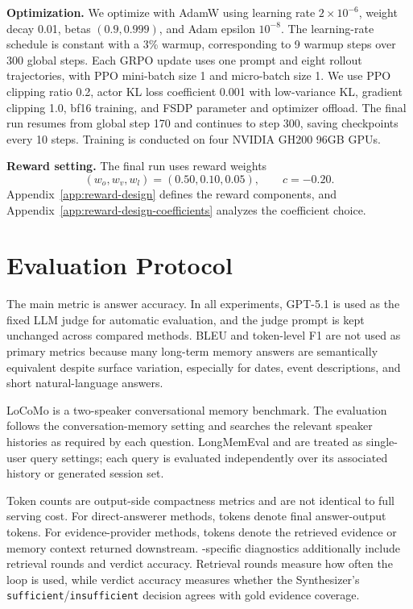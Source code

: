 \textbf{Optimization.}
We optimize with AdamW using learning rate \(2{\times}10^{-6}\), weight decay
0.01, betas \((0.9,0.999)\), and Adam epsilon \(10^{-8}\). The learning-rate
schedule is constant with a 3\% warmup, corresponding to 9 warmup steps over
300 global steps. Each GRPO update uses one prompt and eight rollout
trajectories, with PPO mini-batch size 1 and micro-batch size 1. We use PPO
clipping ratio 0.2, actor KL loss coefficient 0.001 with low-variance KL,
gradient clipping 1.0, bf16 training, and FSDP parameter and optimizer
offload. The final run resumes from global step 170 and continues to step 300,
saving checkpoints every 10 steps. Training is conducted on four NVIDIA GH200
96GB GPUs.

\textbf{Reward setting.}
The final run uses reward weights
\[
  (w_o,w_v,w_l)=(0.50,0.10,0.05),
  \qquad c=-0.20.
\]
Appendix~\ref{app:reward-design} defines the reward components, and
Appendix~\ref{app:reward-design-coefficients} analyzes the coefficient choice.

\section{Evaluation Protocol}
\label{app:evaluation-protocol}

The main metric is answer accuracy. In all experiments, GPT-5.1 is used as the
fixed LLM judge for automatic evaluation, and the judge prompt is kept
unchanged across compared methods. BLEU and token-level F1 are not used as
primary metrics because many long-term memory answers are semantically
equivalent despite surface variation, especially for dates, event descriptions,
and short natural-language answers.

LoCoMo is a two-speaker conversational memory benchmark. The evaluation follows
the conversation-memory setting and searches the relevant speaker histories as
required by each question. LongMemEval and \bench{} are treated as single-user
query settings; each query is evaluated independently over its associated
history or generated session set.

Token counts are output-side compactness metrics and are not identical to full
serving cost. For direct-answerer methods, tokens denote final answer-output
tokens. For evidence-provider methods, tokens denote the retrieved evidence or
memory context returned downstream. \sys{}-specific diagnostics additionally
include retrieval rounds and verdict accuracy. Retrieval rounds measure how
often the loop is used, while verdict accuracy measures whether the
Synthesizer's \texttt{sufficient}/\texttt{insufficient} decision agrees with
gold evidence coverage.

